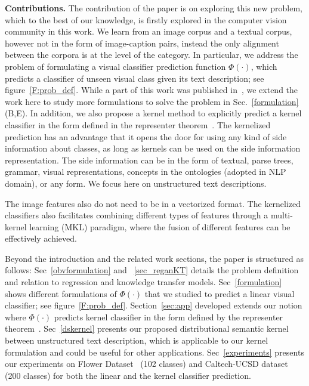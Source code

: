 \textbf{Contributions.} The contribution of the paper is on exploring this new problem, which to the best of our knowledge, is firstly explored in the computer vision community in this work. We learn from an image corpus and a textual corpus, however not in the form of image-caption pairs, instead the only alignment between the corpora is at the level of the category. In particular, we address the problem of formulating a visual classifier prediction function ${\Phi (\cdot)}$, which predicts a  classifier of unseen visual class given its text description; see figure~\ref{F:prob_def}.  While a part of this work was  published in~\cite{Hoseini13}, we extend the work here to study more formulations to solve the problem in Sec.~\ref{formulation} (B,E). In addition, we also propose a kernel method to explicitly  predict a kernel classifier  in the form defined in the representer theorem~\cite{rth01}.  The kernelized prediction has an advantage that it opens the door for using any kind of side information about classes, as long as kernels can be used on the side information representation.  The side information can be in the form of textual, parse trees, grammar, visual representations, concepts in the ontologies (adopted in NLP domain), or any form. We focus here on unstructured text descriptions. The image features also do not need to be in a vectorized format. The kernelized classifiers also facilitates combining different types of features through a multi-kernel learning (MKL) paradigm, where the fusion of different features can be effectively achieved.


Beyond the introduction and the related work sections, the paper is structured as follows: Sec~\ref{obvformulation} and ~\ref{sec_reganKT} details the problem definition and relation to regression and knowledge transfer models. Sec~\ref{formulation} shows different formulations of $\Phi(\cdot)$ that we studied to predict a linear visual classifier; see figure~\ref{F:prob_def}. Section~\ref{sec:app} developed extends our notion where  $\Phi(\cdot)$ predicts kernel classifier in the form defined by the representer theorem~\cite{rth01}. Sec~\ref{dskernel} presents our proposed distributional semantic kernel  between unstructured text description, which is applicable to  our kernel formulation and could be useful for other applications. Sec~\ref{experiments} presents our experiments  on Flower Dataset~\cite{Flower08} (102 classes) and Caltech-UCSD dataset~\cite{CU20010} (200 classes) for both the linear and the kernel classifier prediction.


